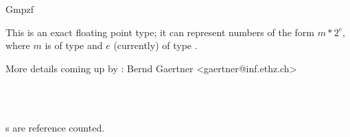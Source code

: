 \begin{ccRefClass} {Gmpzf}
\label{Gmpzf}

\begin{ccAdvanced}
\ccDefinition

This is an exact floating point type; it can represent numbers
of the form $m*2^e$, where $m$ is of type  and $e$ (currently)
of type .

More details coming up by : Bernd Gaertner <gaertner@inf.ethz.ch>
 

\ccIsModel
{}\\
\\


\ccImplementation
{}s are reference counted.

\end{ccAdvanced}

\end{ccRefClass} 
